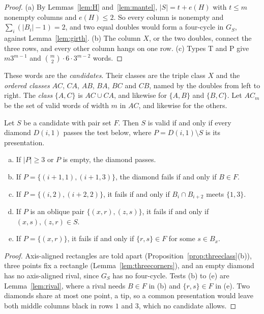 \begin{proof}
(a) By Lemmas~\ref{lem:H} and~\ref{lem:mantel}, $|S|=t+e(H)$ with $t\le m$ nonempty columns and
$e(H)\le2$. So every column is nonempty and $\sum_i(|B_i|-1)=2$, and two equal doubles would form
a four-cycle in $G_S$, against Lemma~\ref{lem:girth}. (b) The column $X$, or the two doubles,
connect the three rows, and every other column hangs on one row. (c) Types T and P give
$m3^{m-1}$ and $\binom m2\cdot6\cdot3^{m-2}$ words.
\end{proof}

These words are the \emph{candidates}. Their classes are the triple class $X$ and the
\emph{ordered classes} $AC$, $CA$, $AB$, $BA$, $BC$ and $CB$, named by the doubles from left
to right. The \emph{class} $\{A,C\}$ is $AC\cup CA$, and likewise for $\{A,B\}$ and
$\{B,C\}$. Let $AC_m$ be the set of valid words of width $m$ in $AC$, and likewise for the others.

\begin{lemma}\label{lem:diamond}
Let $S$ be a candidate with pair set $F$. Then $S$ is valid if and only if every diamond
$D(i,1)$ passes the test below, where $P=D(i,1)\setminus S$ is its presentation.
\begin{enumerate}[(a)]
\item If $|P|\ge3$ or $P$ is empty, the diamond passes.
\item If $P=\{(i+1,1),(i+1,3)\}$, the diamond fails if and only if $B\in F$.
\item If $P=\{(i,2),(i+2,2)\}$, it fails if and only if $B_i\cap B_{i+2}$ meets $\{1,3\}$.
\item If $P$ is an oblique pair $\{(x,r),(z,s)\}$, it fails if and only if $(x,s),(z,r)\in S$.
\item If $P=\{(x,r)\}$, it fails if and only if $\{r,s\}\in F$ for some $s\in B_x$.
\end{enumerate}
\end{lemma}

\begin{proof}
Axis-aligned rectangles are told apart (Proposition~\ref{prop:threeclass}(b)), three points fix
a rectangle (Lemma~\ref{lem:threecorners}), and an empty diamond has no axis-aligned rival, since
$G_S$ has no four-cycle. Tests (b) to (e) are Lemma~\ref{lem:rival}, where a rival needs $B\in F$
in (b) and $\{r,s\}\in F$ in (e). Two diamonds share at most one point, a tip, so a common presentation
would leave both middle columns black in rows $1$ and $3$, which no candidate allows.
\end{proof}


